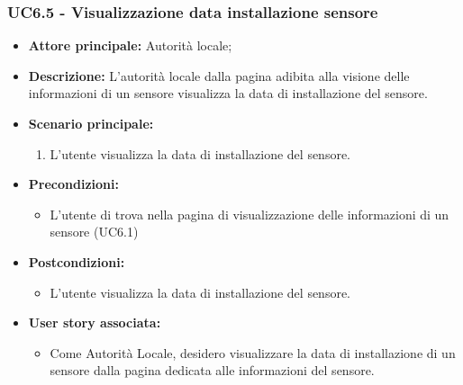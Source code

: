 \documentclass{article}
\begin{document}
\subsubsection{UC6.5 - Visualizzazione data installazione sensore}
\begin{itemize}
    \item \textbf{Attore principale:} Autorità locale;
    \item \textbf{Descrizione:} L’autorità locale dalla pagina adibita alla visione delle informazioni di un sensore visualizza la data di installazione del sensore.
    \item \textbf{Scenario principale:}
          \begin{enumerate}
              \item L'utente visualizza la data di installazione del sensore.
          \end{enumerate}
    \item \textbf{Precondizioni:}
          \begin{itemize}
              \item  L'utente di trova nella pagina di visualizzazione delle informazioni di un sensore (UC6.1)
          \end{itemize}
    \item \textbf{Postcondizioni:}
          \begin{itemize}
              \item  L'utente visualizza la data di installazione del sensore.
          \end{itemize}
    \item \textbf{User story associata:}
          \begin{itemize}
              \item Come Autorità Locale, desidero visualizzare la data di installazione di un sensore dalla pagina dedicata alle informazioni del sensore.
          \end{itemize}
\end{itemize}
\end{document}

